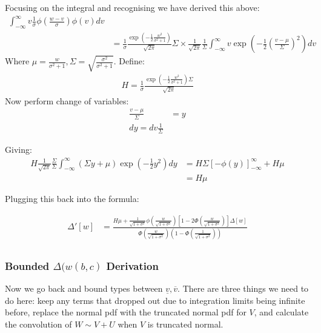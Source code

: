 Focusing on the integral and recognising we have derived this above:
\begin{align*}
    \int^\infty_{-\infty} v \frac{1}{\sigma}\phi\left(\frac{w - v}{\sigma}\right) \phi(v) dv \\ &=
    \frac{1}{\sigma} \frac{\exp\left(-\frac{1}{2}\frac{w^2}{\sigma^2 + 1}\right)}{
        \sqrt{2\pi}
    }
    \Sigma \times 
    \frac{1}{\sqrt{2\pi}}\frac{1}{\Sigma} \int^\infty_{-\infty}
    v \exp\left(
        -\frac{1}{2}
        \left(\frac{v - \mu}{\Sigma}\right)^2
    \right) dv
\end{align*}
Where $\mu = \frac{w}{\sigma^2 + 1}, \Sigma = \sqrt{\frac{\sigma^2}{\sigma^2 + 1}}$.
Define:
\begin{align*}
    H = \frac{1}{\sigma} \frac{
        \exp\left( 
            -\frac{1}{2}\frac{w^2}{\sigma^2 + 1}
        \right)\Sigma
    }{\sqrt{2\pi}}
\end{align*}
Now perform change of variables:
\begin{align*}
    \frac{v - \mu}{\Sigma} &= y \\
    dy = dv \frac{1}{\Sigma}
\end{align*}

Giving:
\begin{align*}
    H \frac{1}{\sqrt{2\pi}} \frac{\Sigma}{\Sigma} \int^\infty_{-\infty} \left(
        \Sigma y + \mu
    \right)\exp\left(-\frac{1}{2}y^2\right) dy &= 
H\Sigma \left[
    -\phi(y)
\right]^\infty_{-\infty} + H\mu \\
&= H\mu
\end{align*}


Plugging this back into the formula:

\begin{align*}
   \Delta'[w] &= 
   \frac{
    H\mu
    + \frac{1}{\sqrt{1 + \sigma^2}}\phi\left(\frac{w}{\sqrt{1 + \sigma^2}}\right) \left[
        1 - 2 \Phi(\frac{w}{\sqrt{1 + \sigma^2}})
    \right] \Delta[w]
   }{
    \Phi\left(\frac{w}{\sqrt{1 + \sigma^2}}\right)\left(1 - \Phi\left(\frac{1}{\sqrt{1 + \sigma^2}}\right)\right)
   } \\
\end{align*}


\subsubsection{Bounded $\Delta(w(b,c)$ Derivation}
Now we go back and bound types between $\underline{v}, \overline{v}$. There are 
three things we need to do here: keep any terms that dropped out due to integration 
limits being infinite before, replace the normal pdf with the truncated normal pdf
for $V$, and calculate the convolution of $W\sim V + U$ when $V$ is truncated normal.


